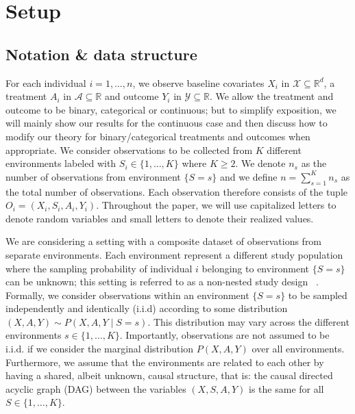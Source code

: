 \documentclass{article}
\begin{document}
\section{Setup}

\subsection{Notation \& data structure}


For each individual $i=1,\dots, n$, we observe baseline covariates $X_i$ in $\mathcal{X}\subseteq \mathbb{R}^d$, a treatment $A_i$ in $\mathcal{A}\subseteq\mathbb{R}$ and outcome $Y_i$ in $\mathcal{Y}\subseteq\mathbb{R}$. We allow the treatment and outcome to be binary, categorical or continuous; but to simplify exposition, we will mainly show our results for the continuous case and then discuss how to modify our theory for binary/categorical treatments and outcomes when appropriate. We consider observations to be collected from $K$ different environments labeled with $S_i\in\{1,\dots, K\}$ where $K\geq 2$. We denote $n_s$ as the number of observations from environment $\{S=s\}$ and we define $n=\sum_{s=1}^K n_s$ as the total number of observations. Each observation therefore consists of the tuple $O_i=(X_i, S_i, A_i, Y_i)$. Throughout the paper, we will use capitalized letters to denote random variables and small letters to denote their realized values. 

We are considering a setting with a composite dataset of observations from separate environments. Each environment represent a different study population where the sampling probability of individual $i$ belonging to environment $\{S=s\}$ can be unknown; this setting is referred to as a non-nested study design~\citep{dahabreh2020extending} . Formally, we consider observations within an environment $\{S=s\}$ to be sampled independently and identically (i.i.d) according to some distribution $(X,A,Y)\sim P(X,A,Y\mid S=s)$. This distribution may vary across the different environments $s\in\{1,\dots,K\}$. Importantly, observations are not assumed to be i.i.d. if we consider the marginal distribution $P(X,A,Y)$ over all environments. Furthermore, we assume that the environments are related to each other by having a shared, albeit unknown, causal structure, that is: the causal directed acyclic graph (DAG) between the variables $(X,S,A,Y)$ is the same for all $S\in\{1,\dots, K\}$.
\end{document}
